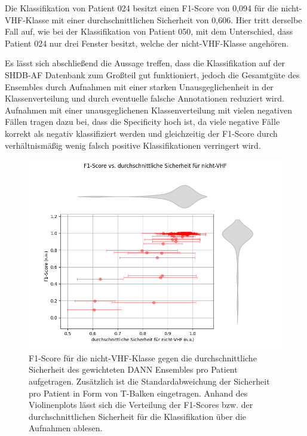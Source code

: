 

Die Klassifikation von Patient 024 besitzt einen F1-Score von 0,094 für die nicht-\gls{VHF}-Klasse mit einer durchschnittlichen Sicherheit von 0,606. Hier tritt derselbe Fall auf, wie bei der Klassifikation von Patient 050, mit dem Unterschied, dass Patient 024 nur drei Fenster besitzt, welche der nicht-\gls{VHF}-Klasse angehören.

Es lässt sich abschließend die Aussage treffen, dass die Klassifikation auf der SHDB-AF Datenbank zum Großteil gut funktioniert, jedoch die Gesamtgüte des Ensembles durch Aufnahmen mit einer starken Unausgeglichenheit in der Klassenverteilung und durch eventuelle falsche Annotationen reduziert wird. Aufnahmen mit einer unausgeglichenen Klassenverteilung mit vielen negativen Fällen tragen dazu bei, dass die Specificity hoch ist, da viele negative Fälle korrekt als negativ klassifiziert werden und gleichzeitig der F1-Score durch verhältnismäßig wenig falsch positive Klassifikationen verringert wird.

\begin{figure}[!ht]%
\centering
	\includegraphics[width=1\textwidth]{./Bilder/shdb_plot_nicht_vhf.png}
\caption[SHDB-AF F1-Score vs. durchschnittliche Sicherheit für nicht-VHF]{F1-Score für die nicht-\gls{VHF}-Klasse gegen die durchschnittliche Sicherheit des gewichteten \gls{DANN} Ensembles pro Patient aufgetragen. Zusätzlich ist die Standardabweichung der Sicherheit pro Patient in Form von T-Balken eingetragen. Anhand des Violinenplots lässt sich die Verteilung der F1-Scores bzw. der durchschnittlichen Sicherheit für die Klassifikation über die Aufnahmen ablesen.} 
\label{fig:shdb_scatter_nvhf}
\end{figure} 


